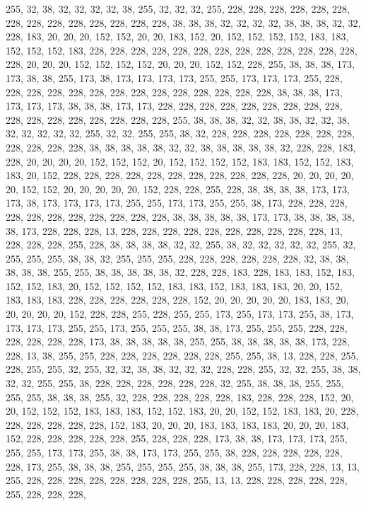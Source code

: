 {	255, 32,  38,  32,  32,  32,  32,  38,  255, 32,  32,  32,  255, 228, 228, 228, 228, 228, 228, 228, 228, 228, 228, 228, 228, 228, 228, 38,  38,  38,  32,  32,  32,  32,  38,  38,  38,  32,  32,  228, 183, 20,  20,  20,  152, 152, 20,  20,  183, 152, 20,  152, 152, 152, 152, 183, 183, 152, 152, 152, 183, 228, 228, 228, 228, 228, 228, 228, 228, 228, 228, 228, 228, 228, 228, 20,  20,  20,  152, 152, 152, 152, 20,  20,  20,  152, 152, 228, 255, 38,  38,  38,  173, 173, 38,  38,  255, 173, 38,  173, 173, 173, 173, 255, 255, 173, 173, 173, 255, 228, 228, 228, 228, 228, 228, 228, 228, 228, 228, 228, 228, 228, 228, 38,  38,  38,  173, 173, 173, 173, 38,  38,  38,  173, 173, 228, 228, 228, 228, 228, 228, 228, 228, 228, 228, 228, 228, 228, 228, 228, 228, 228, 255, 38,  38,  38,  32,  32,  38,  38,  
	32,  32,  38,  32,  32,  32,  32,  32,  255, 32,  32,  255, 255, 38,  32,  228, 228, 228, 228, 228, 228, 228, 228, 228, 228, 228, 38,  38,  38,  38,  38,  32,  32,  38,  38,  38,  38,  38,  32,  228, 228, 183, 228, 20,  20,  20,  20,  152, 152, 152, 20,  152, 152, 152, 152, 183, 183, 152, 152, 183, 183, 20,  152, 228, 228, 228, 228, 228, 228, 228, 228, 228, 228, 228, 20,  20,  20,  20,  20,  152, 152, 20,  20,  20,  20,  20,  152, 228, 228, 255, 228, 38,  38,  38,  38,  173, 173, 173, 38,  173, 173, 173, 173, 255, 255, 173, 173, 255, 255, 38,  173, 228, 228, 228, 228, 228, 228, 228, 228, 228, 228, 228, 38,  38,  38,  38,  38,  173, 173, 38,  38,  38,  38,  38,  173, 228, 228, 228, 13,  228, 228, 228, 228, 228, 228, 228, 228, 228, 228, 13,  228, 228, 228, 255, 228, 38,  38,  38,  38,  32,  
	32,  255, 38,  32,  32,  32,  32,  32,  255, 32,  255, 255, 255, 38,  38,  32,  255, 255, 255, 228, 228, 228, 228, 228, 228, 32,  38,  38,  38,  38,  38,  255, 255, 38,  38,  38,  38,  38,  32,  228, 228, 183, 228, 183, 183, 152, 183, 152, 152, 183, 20,  152, 152, 152, 152, 183, 183, 152, 183, 183, 183, 20,  20,  152, 183, 183, 183, 228, 228, 228, 228, 228, 228, 152, 20,  20,  20,  20,  20,  183, 183, 20,  20,  20,  20,  20,  152, 228, 228, 255, 228, 255, 255, 173, 255, 173, 173, 255, 38,  173, 173, 173, 173, 255, 255, 173, 255, 255, 255, 38,  38,  173, 255, 255, 255, 228, 228, 228, 228, 228, 228, 173, 38,  38,  38,  38,  38,  255, 255, 38,  38,  38,  38,  38,  173, 228, 228, 13,  38,  255, 255, 228, 228, 228, 228, 228, 228, 255, 255, 38,  13,  228, 228, 255, 228, 255, 255, 32,  255, 32,  
	32,  38,  38,  32,  32,  32,  228, 228, 255, 32,  32,  255, 38,  38,  32,  32,  255, 255, 38,  228, 228, 228, 228, 228, 228, 32,  255, 38,  38,  38,  255, 255, 255, 255, 38,  38,  38,  255, 32,  228, 228, 228, 228, 228, 183, 228, 228, 228, 152, 20,  20,  152, 152, 152, 183, 183, 183, 152, 152, 183, 20,  20,  152, 152, 183, 183, 20,  228, 228, 228, 228, 228, 228, 152, 183, 20,  20,  20,  183, 183, 183, 183, 20,  20,  20,  183, 152, 228, 228, 228, 228, 228, 255, 228, 228, 228, 173, 38,  38,  173, 173, 173, 255, 255, 255, 173, 173, 255, 38,  38,  173, 173, 255, 255, 38,  228, 228, 228, 228, 228, 228, 173, 255, 38,  38,  38,  255, 255, 255, 255, 38,  38,  38,  255, 173, 228, 228, 13,  13,  255, 228, 228, 228, 228, 228, 228, 228, 228, 255, 13,  13,  228, 228, 228, 228, 228, 255, 228, 228, 228, 
}

